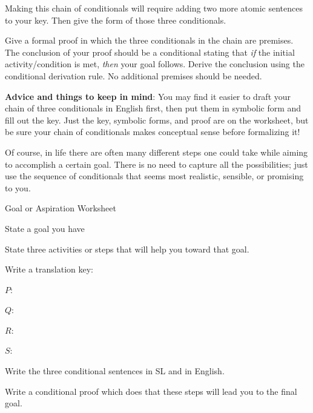 \documentclass[oneside, openany]{book} %
\begin{document}
\noindent Making this chain of conditionals will require adding two more atomic sentences to your key. Then give the form of those three conditionals.

\noindent 

\noindent Give a formal proof in which the three conditionals in the chain are premises. The conclusion of your proof should be a conditional stating that \textit{if }the initial activity/condition is met, \textit{then }your goal follows. Derive the conclusion using the conditional derivation rule. No additional premises should be needed.

\textbf{Advice and things to keep in mind}: You may find it easier to draft your chain of three conditionals in English first, then put them in symbolic form and fill out the key. Just the key, symbolic forms, and proof are on the worksheet, but be sure your chain of conditionals makes conceptual sense before formalizing it!

\noindent Of course, in life there are often many different steps one could take while aiming to accomplish a certain goal. There is no need to capture all the possibilities; just use the sequence of conditionals that seems most realistic, sensible, or promising to you.


\pagebreak

\begin{center}
{\Large Goal or Aspiration Worksheet}
\end{center}

\begin{exercises}
\setlength\itemsep{1.5cm}

\item State a goal you have


\item State three activities or steps that will help you toward that goal.


\item Write a translation key:

\begin{ekey}
\setlength\itemsep{12pt}
\item[$P$:] 
\item[$Q$:]
\item[$R$:]
\item[$S$:]
\end{ekey}



\item Write the three conditional sentences in SL and in English.

\vspace{2cm}

\item Write a conditional proof which does that these steps will lead you to the final goal.

\end{exercises}
\end{document}
